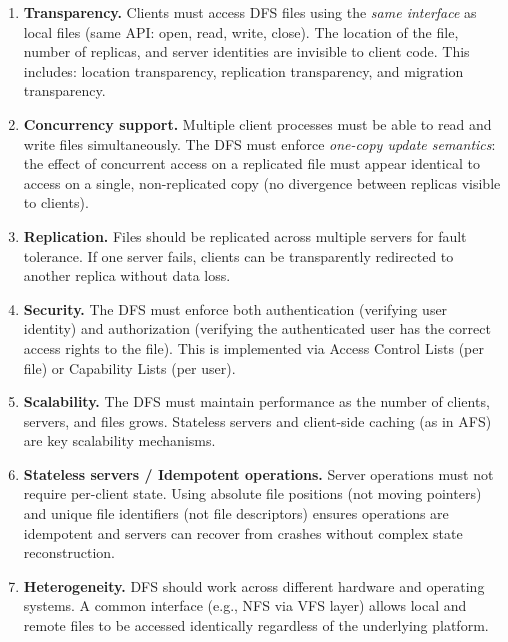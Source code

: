 \documentclass[12pt,a4paper]{article}
\begin{document}
\begin{enumerate}
  \item \textbf{Transparency.} Clients must access DFS files using the \emph{same interface} as local files (same API: open, read, write, close). The location of the file, number of replicas, and server identities are invisible to client code. This includes: location transparency, replication transparency, and migration transparency.

  \item \textbf{Concurrency support.} Multiple client processes must be able to read and write files simultaneously. The DFS must enforce \emph{one-copy update semantics}: the effect of concurrent access on a replicated file must appear identical to access on a single, non-replicated copy (no divergence between replicas visible to clients).

  \item \textbf{Replication.} Files should be replicated across multiple servers for fault tolerance. If one server fails, clients can be transparently redirected to another replica without data loss.

  \item \textbf{Security.} The DFS must enforce both authentication (verifying user identity) and authorization (verifying the authenticated user has the correct access rights to the file). This is implemented via Access Control Lists (per file) or Capability Lists (per user).

  \item \textbf{Scalability.} The DFS must maintain performance as the number of clients, servers, and files grows. Stateless servers and client-side caching (as in AFS) are key scalability mechanisms.

  \item \textbf{Stateless servers / Idempotent operations.} Server operations must not require per-client state. Using absolute file positions (not moving pointers) and unique file identifiers (not file descriptors) ensures operations are idempotent and servers can recover from crashes without complex state reconstruction.

  \item \textbf{Heterogeneity.} DFS should work across different hardware and operating systems. A common interface (e.g., NFS via VFS layer) allows local and remote files to be accessed identically regardless of the underlying platform.
\end{enumerate}
\end{document}
